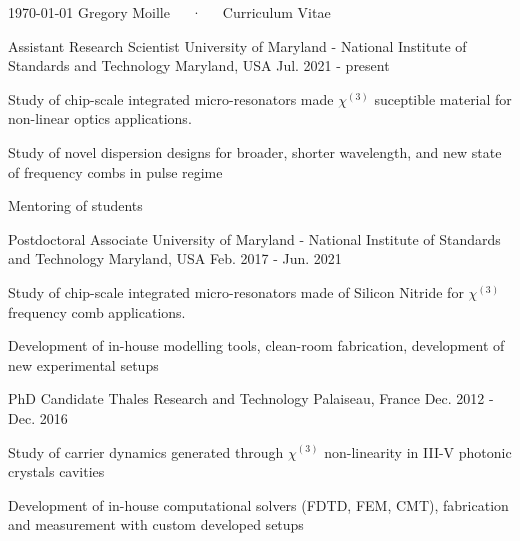 \documentclass[11pt, a4paper]{customcv}
\begin{document}
\makecvheader
\makecvfooter
  {\today}
  {Gregory Moille~~~·~~~Curriculum Vitae}
  {\thepage}

%
{%
}
%
{
    \cventry%
        {Assistant Research Scientist} %
        {University of Maryland - National Institute of Standards and Technology} %
        {Maryland, USA} %
        {Jul. 2021 - present} %
        {
          \begin{cvitems} %
            \item {Study of chip-scale integrated micro-resonators made $\chi^{(3)}$ suceptible material for non-linear optics applications.}
            \item{Study of novel dispersion designs for broader, shorter wavelength, and new state of frequency combs in pulse regime}
            \item{Mentoring of students}
          \end{cvitems}
        }
    \cventry%
        {Postdoctoral Associate} %
        {University of Maryland - National Institute of Standards and Technology} %
        {Maryland, USA} %
        {Feb. 2017 - Jun. 2021} %
        {
          \begin{cvitems} %
            \item {Study of chip-scale integrated micro-resonators made of Silicon Nitride for $\chi^{(3)}$ frequency comb applications.}
            \item{Development of in-house modelling tools, clean-room fabrication, development of new experimental setups}
          \end{cvitems}
        }
    \cventry
        {PhD Candidate} %
        {Thales Research and Technology} %
        {Palaiseau, France} %
        {Dec. 2012 - Dec. 2016} %
        {
          \begin{cvitems} %
            \item {Study of carrier dynamics generated through $\chi^{(3)}$ non-linearity in III-V photonic crystals cavities}
            \item {Development of in-house computational solvers (FDTD, FEM, CMT), fabrication and measurement with custom developed setups}
          \end{cvitems}
        }
}%
\end{document}
